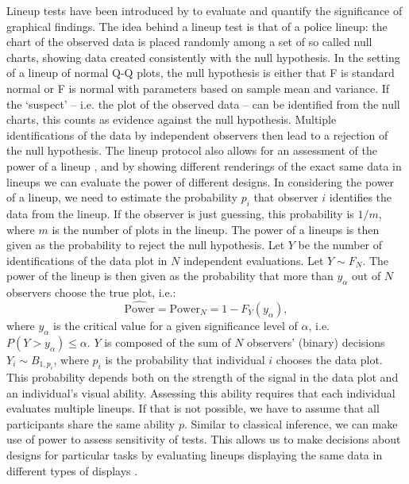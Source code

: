 \documentclass{article}\usepackage[]{graphicx}\usepackage[]{color}
\begin{document}
Lineup tests have been introduced by \citet{buja:2009hp} to evaluate and quantify the significance of graphical findings. The idea behind a lineup test is that of a police lineup: the chart of the observed data is placed randomly among a set of so called null charts, showing data created consistently with the null hypothesis. In the setting of a lineup of normal Q-Q plots, the null hypothesis  is either that F is standard normal or F is normal with parameters based on sample mean and variance.
If the `suspect' -- i.e. the plot of the observed data -- can be identified from the null charts, this counts as evidence against the null hypothesis. Multiple identifications of the data by independent observers then lead to a rejection of the null hypothesis. 
The lineup protocol also allows for an assessment of the power of a lineup \citep{mahbub:2013},  
and by showing different renderings of the exact same data in lineups we can evaluate the power  of different designs.
In considering the power of a lineup, we need to estimate the probability $p_i$ that observer $i$ identifies the data from the lineup. If the observer is just guessing, this probability is $1/m$, where $m$ is the number of plots in the lineup.
The power of a lineups is then given as the probability to reject the null hypothesis. Let $Y$ be the number of identifications of the data plot in $N$ independent evaluations. Let $Y \sim F_N$. The power of the lineup is then given as the probability that more than $y_\alpha$ out of $N$ observers
choose the true plot, i.e.:
\begin{equation}\label{eqn:power}
\widehat{\text{Power}} = \text{Power}_{N} = 1 - F_{Y} (y_{\alpha}),
\end{equation}
where $y_\alpha$ is the critical value for a given significance level of $\alpha$, i.e.~$P(Y >  y_{\alpha}) \le \alpha$. $Y$ is composed of the sum of $N$ observers' (binary) decisions $Y_i \sim B_{1, p_i}$, where  $p_i$ is the probability that individual $i$ chooses the data plot. This probability  depends both on the strength of the signal in the data plot and an individual's visual ability.
Assessing this ability requires that each individual evaluates multiple lineups. 
If that is not possible, we have to assume that all participants share the same ability $p$. %
Similar to classical inference, we can make use of power to assess sensitivity of tests. This allows us to make decisions about designs for particular tasks by evaluating lineups displaying  the same data in different types of displays \citep{Hofmann:2012ts}. 
\end{document}
